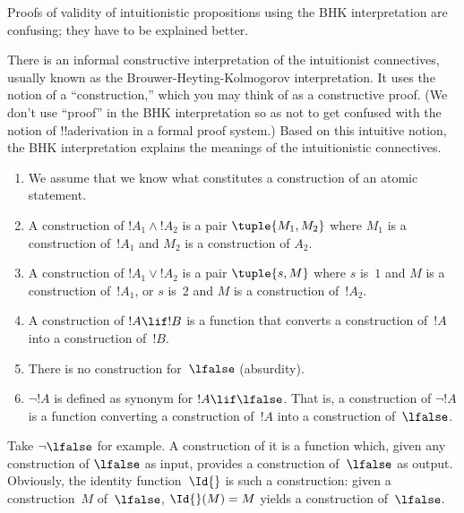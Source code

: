 \documentclass[../../../include/open-logic-section]{subfiles}
\begin{document}


\begin{editorial}
  Proofs of validity of intuitionistic propositions using the BHK
  interpretation are confusing; they have to be explained better.
\end{editorial}

There is an informal constructive interpretation of the intuitionist
connectives, usually known as the Brouwer-Heyting-Kolmogorov
interpretation. It uses the notion of a ``construction,'' which you
may think of as a constructive proof. (We don't use ``proof'' in the
BHK interpretation so as not to get confused with the notion of
!!a{derivation} in a formal proof system.) Based on this intuitive
notion, the BHK interpretation explains the meanings of the
intuitionistic connectives.

\begin{enumerate}
\item We assume that we know what constitutes a construction of an atomic
  statement.
\item A construction of $!A_1 \land !A_2$ is a pair $\tuple{M_1, M_2}$
  where $M_1$ is a construction of~$!A_1$ and $M_2$ is a construction
  of $A_2$.
\item A construction of $!A_1 \lor !A_2$ is a pair $\tuple{s, M}$
  where $s$ is~$1$ and $M$ is a construction of~$!A_1$, or $s$ is~$2$
  and $M$ is a construction of~$!A_2$.
\item A construction of $!A \lif !B$ is a function that converts a
  construction of~$!A$ into a construction of~$!B$.
\item There is no construction for~$\lfalse$ (absurdity).
\item $\lnot !A$ is defined as synonym for $!A \lif \lfalse$. That is,
  a construction of $\lnot !A$ is a function converting a construction
  of~$!A$ into a construction of~$\lfalse$.
\end{enumerate}

\begin{ex}
Take $\lnot \lfalse$ for example. A construction of it is a function
which, given any construction of $\lfalse$ as input, provides a
construction of~$\lfalse$ as output. Obviously, the identity
function~$\Id{}$ is such a construction: given a construction~$M$
of~$\lfalse$, $\Id{}(M) = M$ yields a construction of~$\lfalse$.
\end{ex}
\end{document}
